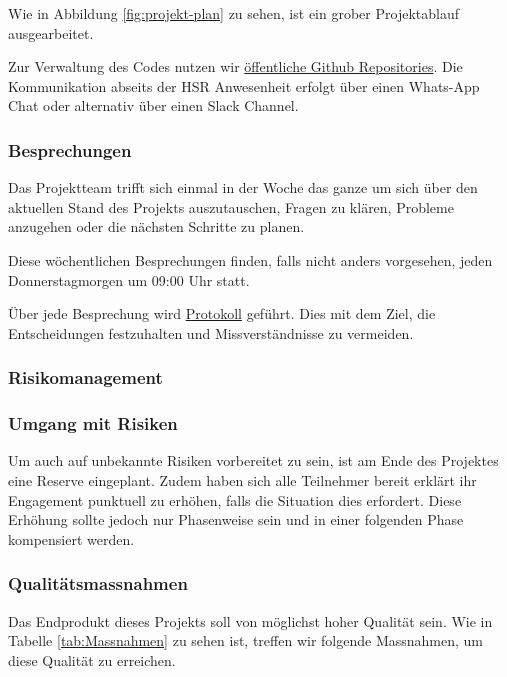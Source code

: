 Wie in Abbildung \ref{fig:projekt-plan} zu sehen, ist ein grober Projektablauf ausgearbeitet. 


Zur Verwaltung des Codes nutzen wir \href{https://github.com/BrainingOutOfBox/App}{öffentliche Github Repositories}. Die Kommunikation abseits der HSR Anwesenheit erfolgt über einen Whats-App Chat oder alternativ über einen Slack Channel.

\subsubsection*{Besprechungen}
Das Projektteam trifft sich einmal in der Woche das ganze um sich über den aktuellen Stand des Projekts auszutauschen, Fragen zu klären, Probleme anzugehen oder die nächsten Schritte zu planen. 

Diese wöchentlichen Besprechungen finden, falls nicht anders vorgesehen, jeden Donnerstagmorgen um 09:00 Uhr statt. 

Über jede Besprechung wird \href{https://github.com/BrainingOutOfBox/Doc/wiki} {Protokoll} geführt. Dies mit dem Ziel, die Entscheidungen festzuhalten und Missverständnisse zu vermeiden.

\subsubsection*{Risikomanagement}

\subsubsection*{Umgang mit Risiken}
Um auch auf unbekannte Risiken vorbereitet zu sein, ist am Ende des Projektes eine Reserve eingeplant. Zudem haben sich alle Teilnehmer bereit erklärt ihr Engagement punktuell zu erhöhen, falls die Situation dies erfordert. Diese Erhöhung sollte jedoch nur Phasenweise sein und in einer folgenden Phase kompensiert werden.

\subsubsection*{Qualitätsmassnahmen}
Das Endprodukt dieses Projekts soll von möglichst hoher Qualität sein. Wie in Tabelle \ref{tab:Massnahmen} zu sehen ist, treffen wir folgende Massnahmen, um diese Qualität zu erreichen.

